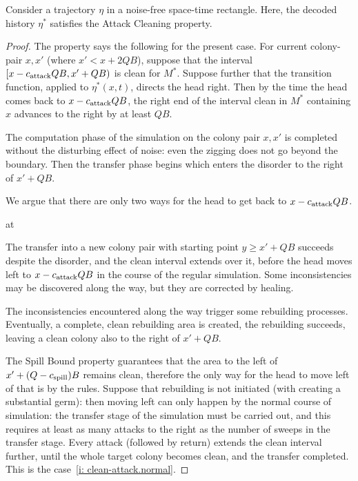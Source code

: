 \documentclass[11pt]{memoir}
\theoremstyle{definition} %
\renewcommand{\ge}{\geq}
\def\B{B}
\newcommand{\Q}{Q}
\newcommand{\cns}[1]{c_{\textrm{\upshape #1}}}
\newcommand{\CAtt}{\cns{attack}}
\newcommand{\CSpill}{\cns{spill}}
\begin{document}
\begin{lemma}\label{lem:clean-attack}
Consider a trajectory \( \eta \) in a noise-free space-time rectangle.
Here, the decoded history \( \eta^{*} \) satisfies the Attack Cleaning property.
\end{lemma}
\begin{proof}
  \begin{sloppypar}The property says the following for the present case.
For current colony-pair \( x,x' \) (where \( x'< x+2\Q\B \)), suppose that the interval
\( \lint{x-\CAtt\Q\B}{x'+\Q\B} \) is clean for \( M^{*} \).
Suppose further that the transition function, applied to \( \eta^{*}(x,t) \), directs the head right.
Then by the time the head comes back to \( x-\CAtt\Q\B \),
the right end of the interval clean in \( M^{*} \)
containing \( x \) advances to the right by at least \( \Q\B \).
 \end{sloppypar}

  

The computation phase of the simulation on the colony pair 
\( x, x' \) is completed without the disturbing effect
of noise: even the zigging does not go beyond the boundary.
Then the transfer phase begins which enters the disorder to the right of \( x'+\Q\B \).

We argue that there are only two ways for the head to get back to \( x-\CAtt\Q\B \).
\begin{varenum}{at}
\item\label{i: clean-attack.normal} The transfer into a new colony pair with starting point
\( y\ge x'+\Q\B \) succeeds despite the disorder, and the clean interval extends over it, before
the head moves left to \( x-\CAtt\Q\B \) in the course of the regular simulation.
Some inconsistencies may be discovered along the way, but they are corrected by healing.

\item\label{i: clean-attack.rebuild} The inconsistencies encountered along the way trigger some
rebuilding processes.
Eventually, a complete, clean rebuilding area is created, the rebuilding succeeds, leaving a clean
colony also to the right of \( x'+\Q\B \).
\end{varenum}

The Spill Bound property guarantees that the area to the left
of \( x'+(\Q-\CSpill)\B \) remains clean,
therefore the only way for the head to move left of that is by the rules.
Suppose that rebuilding is not initiated (with creating a substantial germ):
then moving left can only happen by the normal
course of simulation: the transfer stage of the simulation must be carried out, and this requires 
at least as many attacks to the right as the number of sweeps in the transfer stage.
Every attack (followed by return) extends the clean interval further, until the whole target colony becomes clean,
and the transfer completed.
This is the case~\eqref{i: clean-attack.normal}.


\end{proof}
\end{document}
